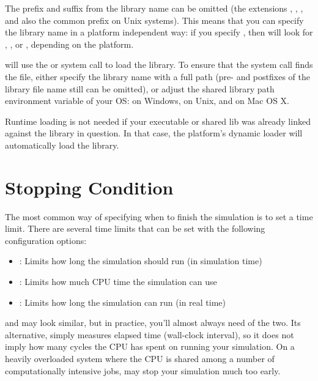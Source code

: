 The prefix and suffix from the library name can be omitted (the extensions
, , , and also the common  prefix
on Unix systems). This means that you can specify the library name in a
platform independent way: if you specify , then {\opp} will
look for , ,  or ,
depending on the platform.

{\opp} will use the  or  system call to
load the library. To ensure that the system call finds the file, either
specify the library name with a full path (pre- and postfixes of the library
file name still can be omitted), or adjust the shared library path environment
variable of your OS:  on Windows,  on Unix,
and  on Mac OS X.

\begin{note}
  Runtime loading is not needed if your executable or shared lib was
  already linked against the library in question. In that case,
  the platform's dynamic loader will automatically load the library.
\end{note}


\section{Stopping Condition}
\label{sec:run-sim:stopping-condition}

The most common way of specifying when to finish the simulation is to set a
time limit. There are several time limits that can be set with the following
configuration options:

\begin{itemize}
  \item {} : Limits how long the simulation should run (in simulation time)
  \item {} : Limits how much CPU time the simulation can use
  \item {} : Limits how long the simulation can run (in real time)
\end{itemize}

\begin{note}
 and  may look
similar, but in practice, you'll almost always need  of
the two. Its alternative,  simply measures elapsed
time (wall-clock interval), so it does not imply how many cycles the CPU has
spent on running your simulation. On a heavily overloaded system where the CPU
is shared among a number of computationally intensive jobs,
 may stop your simulation much too early.
\end{note}

